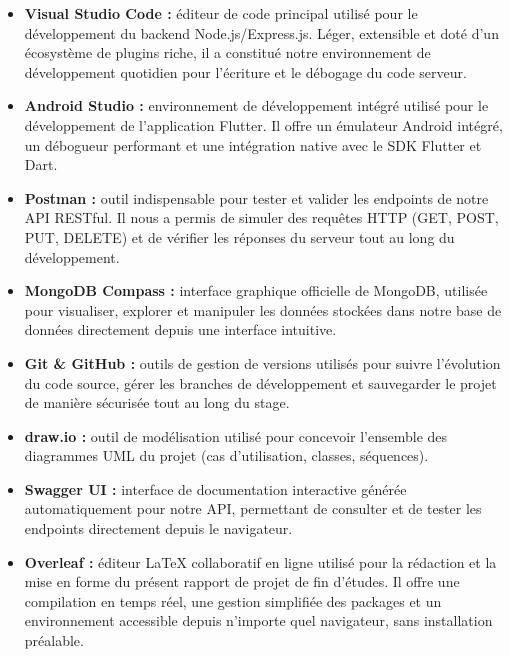 \documentclass[12pt,a4paper]{report}
\begin{document}
	\begin{itemize}
		\item \textbf{Visual Studio Code :} éditeur de code principal utilisé 
		pour le développement du backend Node.js/Express.js. Léger, extensible 
		et doté d'un écosystème de plugins riche, il a constitué notre 
		environnement de développement quotidien pour l'écriture et le débogage 
		du code serveur.
		
		\item \textbf{Android Studio :} environnement de développement intégré 
		utilisé pour le développement de l'application Flutter. Il offre un 
		émulateur Android intégré, un débogueur performant et une intégration 
		native avec le SDK Flutter et Dart.
		
		\item \textbf{Postman :} outil indispensable pour tester et valider 
		les endpoints de notre API RESTful. Il nous a permis de simuler des 
		requêtes HTTP (GET, POST, PUT, DELETE) et de vérifier les réponses 
		du serveur tout au long du développement.
		
		\item \textbf{MongoDB Compass :} interface graphique officielle de 
		MongoDB, utilisée pour visualiser, explorer et manipuler les données 
		stockées dans notre base de données directement depuis une interface 
		intuitive.
		
		\item \textbf{Git \& GitHub :} outils de gestion de versions utilisés 
		pour suivre l'évolution du code source, gérer les branches de 
		développement et sauvegarder le projet de manière sécurisée tout au 
		long du stage.
		
		\item \textbf{draw.io :} outil de modélisation utilisé pour concevoir 
		l'ensemble des diagrammes UML du projet (cas d'utilisation, classes, 
		séquences).
		
		\item \textbf{Swagger UI :} interface de documentation interactive 
		générée automatiquement pour notre API, permettant de consulter et 
		de tester les endpoints directement depuis le navigateur.
		
		\item \textbf{Overleaf :} éditeur \LaTeX{} collaboratif en ligne utilisé 
		pour la rédaction et la mise en forme du présent rapport de projet de 
		fin d'études. Il offre une compilation en temps réel, une gestion 
		simplifiée des packages et un environnement accessible depuis n'importe 
		quel navigateur, sans installation préalable.
	\end{itemize}
\end{document}
